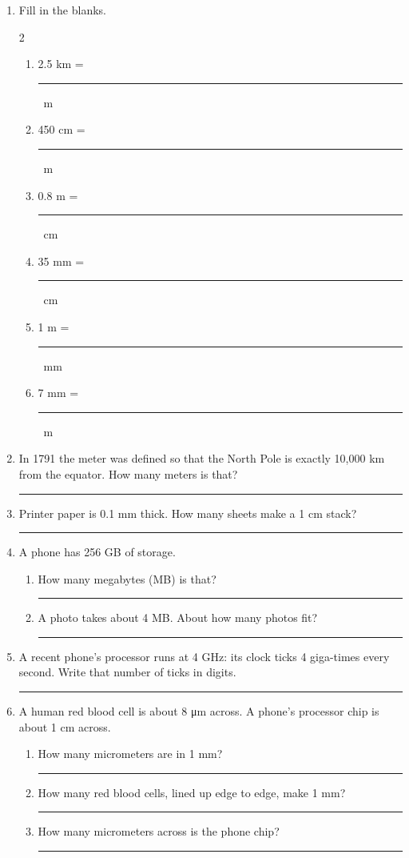\documentclass[12pt, twoside]{article}
\newcommand{\blank}[1][2.4cm]{\rule{#1}{0.4pt}}
\begin{document}
\begin{enumerate}[itemsep=0.55cm]

\item Fill in the blanks.
  \begin{multicols}{2}
    \begin{enumerate}[itemsep=0.65cm]
      \item 2.5 km = \blank\ m
      \item 450 cm = \blank\ m
      \item 0.8 m = \blank\ cm
      \item 35 mm = \blank\ cm
      \item 1 m = \blank\ mm
      \item 7 mm = \blank\ m
    \end{enumerate}
  \end{multicols}

\item In 1791 the meter was defined so that the North Pole is exactly 10{,}000 km
  from the equator. How many meters is that? \hfill \blank[3.2cm]

\item Printer paper is 0.1 mm thick. How many sheets make a 1 cm stack? \hfill \blank

\item A phone has 256 GB of storage.
  \begin{enumerate}[itemsep=0.6cm]
    \item How many megabytes (MB) is that? \hfill \blank[3.2cm]
    \item A photo takes about 4 MB. About how many photos fit? \hfill \blank[3.2cm]
  \end{enumerate}

\item A recent phone's processor runs at 4 GHz: its clock ticks 4 giga-times every
  second. Write that number of ticks in digits. \hfill \blank[4cm]

\item A human red blood cell is about 8 \si{\micro\metre} across. A phone's processor
  chip is about 1 cm across.
  \begin{enumerate}[itemsep=0.6cm]
    \item How many micrometers are in 1 mm? \hfill \blank
    \item How many red blood cells, lined up edge to edge, make 1 mm? \hfill \blank
    \item How many micrometers across is the phone chip? \hfill \blank
  \end{enumerate}


\end{enumerate}
\end{document}
